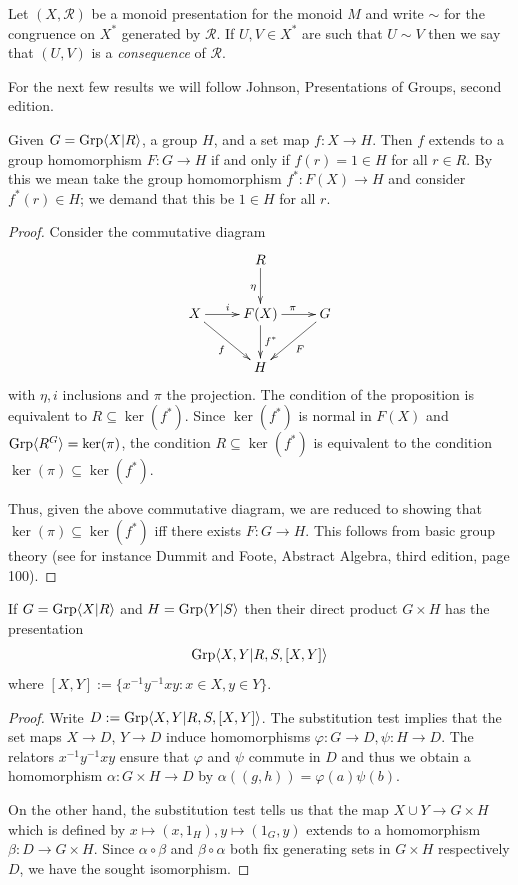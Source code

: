 \begin{defn} Let $(X,\mathcal{R})$ be a monoid presentation for the monoid $M$
    and write $\sim$ for the congruence on $X^*$ generated by $\mathcal{R}$. If
    $U,V\in X^*$ are such that $U \sim V$ then we say that $(U,V)$ is a
    \emph{consequence} of $\mathcal{R}$.
\end{defn}

\begin{ap} For the next few results we will follow Johnson, Presentations of
    Groups, second edition.
\end{ap}

\begin{prop} Given $G = \mathrm{Grp}\langle X|R\rangle$, a group $H$, and a set
    map $f : X \rightarrow H$. Then $f$ extends to a group homomorphism $F : G
    \rightarrow H$ if and only if $f(r) = 1 \in H$ for all $r\in R$. By this we
    mean take the group homomorphism $f^* : F(X) \rightarrow H$ and consider
    $f^*(r)\in H$; we demand that this be $1\in H$ for all $r$.
\end{prop}
\begin{proof} Consider the commutative diagram \[ \xymatrix{ & R \ar[d]_\eta \\
    X \ar[dr]_f \ar[r]^i & F(X) \ar[d]^{f^*} \ar[r]^\pi & G\ar[dl]^F\\ & H
    } \] with $\eta, i$ inclusions and $\pi$ the projection. The condition of
    the proposition is equivalent to $R \subseteq \ker(f^*)$. Since $\ker(f^*)$
    is normal in $F(X)$ and $\mathrm{Grp}\langle R^G\rangle = \ker(\pi)$, the condition $R \subseteq
    \ker(f^*)$ is equivalent to the condition $\ker(\pi) \subseteq \ker(f^*)$.

    Thus, given the above commutative diagram, we are reduced to showing that
    $\ker(\pi) \subseteq \ker(f^*)$ iff there exists $F : G \rightarrow H$.
    This follows from basic group theory (see for instance Dummit and Foote,
    Abstract Algebra, third edition, page 100).
\end{proof}

\begin{prop}\label{dirprod} If $G =\mathrm{Grp}\langle X|R\rangle$ and $H=\mathrm{Grp}\langle Y|S\rangle$ then their
    direct product $G\times H$ has the presentation \[\mathrm{Grp}\langle X,Y|R,S,[X,Y]\rangle \]
    where $[X,Y] := \{x^{-1}y^{-1}xy : x\in X, y\in Y\}.$
\end{prop}
\begin{proof} Write $D := \mathrm{Grp}\langle X,Y|R,S,[X,Y]\rangle$. The substitution test implies
    that the set maps $X \rightarrow D$, $Y \rightarrow D$ induce homomorphisms
    $\varphi : G \rightarrow D, \psi :  H \rightarrow D$. The relators
    $x^{-1}y^{-1}xy$ ensure that $\varphi$ and $\psi$ commute in $D$ and thus
    we obtain a homomorphism $\alpha : G\times H \rightarrow D$ by $\alpha(
    (g,h) ) = \varphi(a)\psi(b)$.

    On the other hand, the substitution test tells us that the map $X \cup Y
    \rightarrow G\times H$ which is defined by $x \mapsto (x,1_H), y\mapsto
    (1_G, y)$ extends to a homomorphism $\beta : D \rightarrow G\times H$.
    Since $\alpha\circ\beta$ and $\beta \circ \alpha$ both fix generating sets
    in $G\times H$ respectively $D$, we have the sought isomorphism.
\end{proof}

